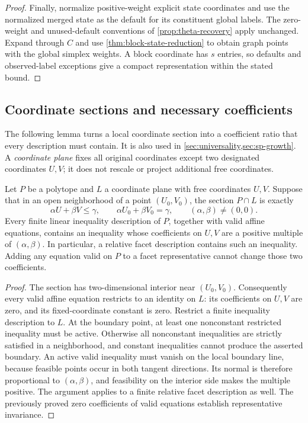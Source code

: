 \begin{proof}
Finally, normalize positive-weight explicit state coordinates and use
the normalized merged state as the default for its constituent global
labels. The zero-weight and unused-default conventions of
\cref{prop:theta-recovery} apply unchanged. Expand through $C$ and
use \cref{thm:block-state-reduction} to obtain graph points with the
global simplex weights. A block coordinate has $s$ entries, so defaults
and observed-label exceptions give a compact representation within the
stated bound.
\end{proof}

\subsection{Coordinate sections and necessary coefficients}\label{subsec:section-facets}
The following lemma turns a local coordinate section into a coefficient
ratio that every description must contain. It is also used in
\cref{sec:universality,sec:sp-growth}. A \emph{coordinate plane}
fixes all original coordinates except two designated coordinates $U,V$;
it does not rescale or project additional free coordinates.

\begin{lemma}\label{lem:section-facet}
Let $P$ be a polytope and $L$ a coordinate plane with free coordinates
$U,V$. Suppose that in an open neighborhood of a point $(U_0,V_0)$,
the section $P\cap L$ is exactly
\begin{equation}\label{eq:local-halfplane}
                 \alpha U+\beta V\le\gamma,
 \qquad \alpha U_0+\beta V_0=\gamma,\qquad
                 (\alpha,\beta)\ne(0,0).
\end{equation}
Every finite linear inequality description of $P$, together with valid
affine equations, contains an inequality whose coefficients on $U,V$
are a positive multiple of $(\alpha,\beta)$. In particular, a relative
facet description contains such an inequality. Adding any equation
valid on $P$ to a facet representative cannot change those two coefficients.
\end{lemma}
\begin{proof}
The section has two-dimensional interior near $(U_0,V_0)$. Consequently
every valid affine equation restricts to an identity on $L$: its
coefficients on $U,V$ are zero, and its fixed-coordinate constant is
zero. Restrict a finite inequality description to $L$. At the boundary
point, at least one nonconstant restricted inequality must be active.
Otherwise all nonconstant inequalities are strictly satisfied in a
neighborhood, and constant inequalities cannot produce the asserted
boundary. An active valid inequality must vanish on the local boundary
line, because feasible points occur in both tangent directions. Its
normal is therefore proportional to $(\alpha,\beta)$, and feasibility
on the interior side makes the multiple positive. The argument applies
to a finite relative facet description as well. The previously proved
zero coefficients of valid equations establish representative invariance.
\end{proof}


